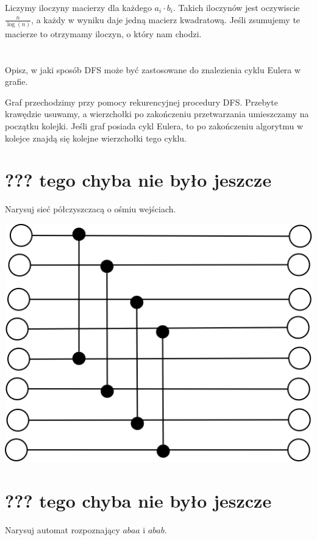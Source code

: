\documentclass[svgnames]{report}
\begin{document}
Liczymy iloczyny macierzy dla każdego $a_i \cdot b_i$. Takich iloczynów jest oczywiscie $\frac{n}{\log(n)}$, 
a każdy w wyniku daje jedną macierz kwadratową. Jeśli zsumujemy te macierze to otrzymamy iloczyn, o który nam chodzi.

\section{}
\begin{framed}
Opisz, w jaki sposób DFS może być zastosowane do znalezienia cyklu Eulera w grafie.
\end{framed}

Graf przechodzimy przy pomocy rekurencyjnej procedury DFS. Przebyte krawędzie usuwamy, a wierzchołki po zakończeniu przetwarzania umieszczamy na początku kolejki. Jeśli graf posiada cykl Eulera, to po zakończeniu algorytmu w kolejce znajdą się kolejne wierzchołki tego cyklu.


\section{??? tego chyba nie było jeszcze}
\begin{framed}
Narysuj sieć półczyszczacą o ośmiu wejściach.
\end{framed}

\includegraphics[scale=0.55]{images/20.png}

\section{??? tego chyba nie było jeszcze}
\begin{framed}
Narysuj automat rozpoznający $abaa$ i $abab$.
\end{framed}
\end{document}
